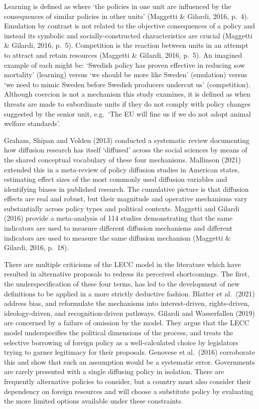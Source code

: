 \documentclass[twocolumn, 10pt, a4paper]{article}
\begin{document}
Learning is defined as where `the policies in one unit are influenced by the
consequences of similar policies in other units' (Maggetti \& Gilardi, 2016,
p.~4). Emulation by contrast is not related to the objective consequences of a
policy and instead its symbolic and socially-constructed characteristics are crucial
(Maggetti \& Gilardi, 2016, p.~5). Competition is the reaction between units in an
attempt to attract and retain resources (Maggetti \& Gilardi, 2016, p.~5). An
imagined example of each might be: `Swedish policy has proven effective in reducing
sow mortality' (learning) versus `we should be more like Sweden' (emulation) versus
`we need to mimic Sweden before Swedish producers undercut us' (competition). Although
coercion is not a mechanism this study examines, it is defined as when threats are
made to subordinate units if they do not comply with policy changes suggested by
the senior unit, e.g.\ `The EU will fine us if we do not adopt animal welfare
standards'.

Graham, Shipan and Volden (2013) conducted a systematic review documenting how
diffusion research has itself `diffused' across the social sciences by means of the
shared conceptual vocabulary of these four mechanisms. Mallinson (2021) extended this
in a meta-review of policy diffusion studies in American states, estimating effect
sizes of the most commonly used diffusion variables and identifying biases in
published research. The cumulative picture is that diffusion effects are real and
robust, but their magnitude and operative mechanisms vary substantially across policy
types and political contexts. Maggetti and Gilardi (2016) provide a meta-analysis of
114 studies demonstrating that the same indicators are used to measure different
diffusion mechanisms and different indicators are used to measure the same diffusion
mechanism (Maggetti \& Gilardi, 2016, p.~18).

There are multiple criticisms of the LECC model in the literature which have resulted
in alternative proposals to redress its perceived shortcomings. The first, the
underspecification of these four terms, has led to the development of new definitions
to be applied in a more strictly deductive fashion. Blatter et al.\ (2021) address
bias, and reformulate the mechanisms into interest-driven, rights-driven,
ideology-driven, and recognition-driven pathways. Gilardi and Wasserfallen (2019) are
concerned by a failure of omission by the model. They argue that the LECC model
underspecifies the political dimensions of the process, and treats the selective
borrowing of foreign policy as a well-calculated choice by legislators trying to
garner legitimacy for their proposals. Genovese et al.\ (2016) corroborate this and
show that such an assumption would be a systematic error. Governments are rarely
presented with a single diffusing policy in isolation. There are frequently
alternative policies to consider, but a country must also consider their dependency on
foreign resources and will choose a substitute policy by evaluating the more limited
options available under these constraints.
\end{document}
